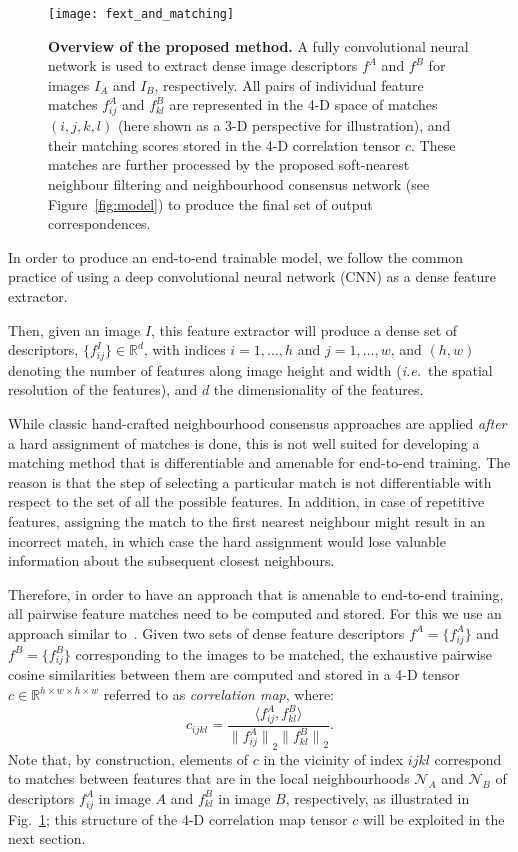 \documentclass{article}
\begin{document}
\begin{figure}[t]
  \centering
    \texttt{[image: fext\_and\_matching]}
    \caption{\small \textbf{Overview of the proposed method.} A fully convolutional neural network is used to extract dense image descriptors $f^A$ and $f^B$ for images $I_A$ and $I_B$, respectively. All pairs of individual feature matches $f^A_{ij}$ and $f^B_{kl}$ are represented in the 4-D space of matches $(i,j,k,l)$ (here shown as a 3-D perspective for illustration), and their matching scores stored in the 4-D correlation tensor $c$. These matches are further processed by the proposed soft-nearest neighbour filtering and neighbourhood consensus network (see Figure~\ref{fig:model}) to produce the final set of output correspondences.\label{fig:fext_and_matching}}
\end{figure}


In order to produce an end-to-end trainable model, we follow the common practice of using a deep convolutional neural network (CNN)
as a dense feature extractor.

Then, given an image $I$, this feature extractor will produce a dense set of descriptors, $\{f^I_{ij}\} \in \mathbb{R}^d$, 
with indices $i=1,\dots,h$ and $j=1,\dots,w$, and $(h,w)$ denoting the number of features along image height and width 
(\emph{i.e.}\ the spatial resolution of the features), and $d$ the dimensionality of the features.

While classic hand-crafted neighbourhood consensus approaches are applied \emph{after} a hard assignment of matches is done, this is not well suited for developing a matching method that is differentiable and amenable for end-to-end training. The reason is that the step of selecting a particular match 
is not differentiable with respect to the set of all the possible features. In addition, in case of repetitive features, assigning the match to the first nearest neighbour might result in an incorrect match, in which case the hard assignment would lose valuable information about the subsequent closest neighbours.


Therefore, in order to have an approach that is amenable to end-to-end training, all pairwise feature matches need to be computed and stored. For this we use an approach similar to~\cite{Rocco17}. Given two sets of dense feature descriptors $f^A=\{f^A_{ij}\}$ and $f^B=\{f^B_{ij}\}$ corresponding to the images to be matched, the exhaustive pairwise cosine similarities between them are computed and stored in a 4-D tensor $c\in \mathbb{R}^{h\times w\times h\times w}$ referred to as \emph{correlation map}, where:
\begin{equation}
    c_{ijkl}=\frac{\langle f^A_{ij}, f^B_{kl}\rangle}{{\|f^A_{ij}\|}_2 {\|f^B_{kl}\|}_2}.
    \label{eq:corrmap}
\end{equation}
Note that, by construction, elements of $c$ in the vicinity of index $ijkl$ correspond to matches between features that are in the local neighbourhoods $\mathcal{N}_A$ and $\mathcal{N}_B$ of descriptors $f^A_{ij}$ in image $A$ and $f^B_{kl}$ in image $B$, respectively, as illustrated in Fig.~\ref{fig:fext_and_matching}; this structure of the 4-D correlation map tensor $c$ will be exploited in the next section.
\end{document}
